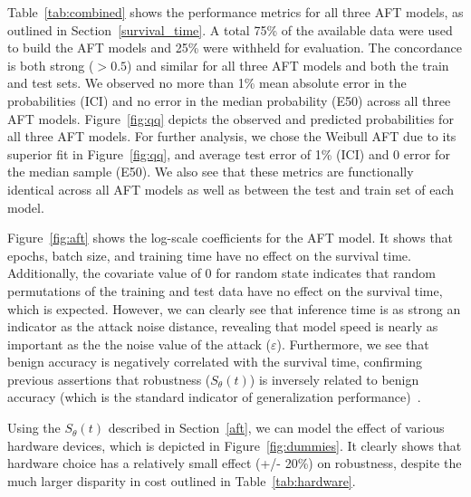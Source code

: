 \documentclass[conference]{IEEEtran}
\begin{document}
{Table~\ref{tab:combined} shows the performance metrics for all three AFT models, as outlined in Section~\ref{survival_time}. A total 75\% of the available data were used to build the AFT models and 25\% were withheld for evaluation. The concordance is both strong ($>0.5$) and similar for all three AFT models and both the train and test sets. We observed no more than 1\% mean absolute error in the probabilities (ICI) and no error in the median probability (E50) across all three AFT models. Figure~\ref{fig:qq} depicts the observed and predicted probabilities for all three AFT models. For further analysis, we chose the Weibull AFT due to its superior fit in Figure~\ref{fig:qq}, and average test error of 1\% (ICI) and 0 error for the median sample (E50). We also see that these metrics are  functionally identical across all AFT models as well as between the test and train set of each model. 


Figure~\ref{fig:aft} shows the log-scale coefficients for the AFT model. It shows that epochs, batch size, and training time have no effect on the survival time. Additionally, the covariate value of 0 for random state indicates that random permutations of the training and test data have no effect on the survival time, which is expected. However, we can clearly see that inference time  is as strong an indicator as the attack noise distance, revealing that model speed is nearly as important as the the noise value of the attack ($\varepsilon$). Furthermore, we see that benign accuracy is negatively correlated with the survival time, confirming previous assertions that robustness ($S_{\theta}(t)$) is inversely related to benign accuracy (which is the standard indicator of generalization performance)~\cite{carlini_towards_2017}.

Using the $S_{\theta}(t)$ described in Section~\ref{aft}, we can model the effect of various hardware devices, which is depicted in Figure~\ref{fig:dummies}. It clearly shows that hardware choice has a relatively small effect (+/- 20\%) on robustness, despite the much larger disparity in cost outlined in Table~\ref{tab:hardware}.

}
\end{document}
